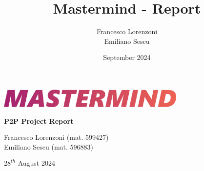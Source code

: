 

\title{Mastermind - Report}
\author{Francesco Lorenzoni\\Emiliano Sescu}
\date{September 2024}



\begin{titlepage}
    \begin{center}
        \vspace*{2.25in} %
        
        \includegraphics[width=0.7\textwidth]{images/Mastermind_Logo_NoBorder_alpha.jpg} %
        
        \vspace{1in}
        
        {\LARGE \textbf{P2P Project Report}} %
        
        \vspace{0.5in}
        
        {\large Francesco Lorenzoni (mat. 599427)\\Emiliano Sescu (mat. 596883)}
        
        \vspace{0.5in}
        
        {\large $28^{th}$ August 2024}

        \vspace{1in}

    \end{center}
\end{titlepage}

\newpage

\tableofcontents









